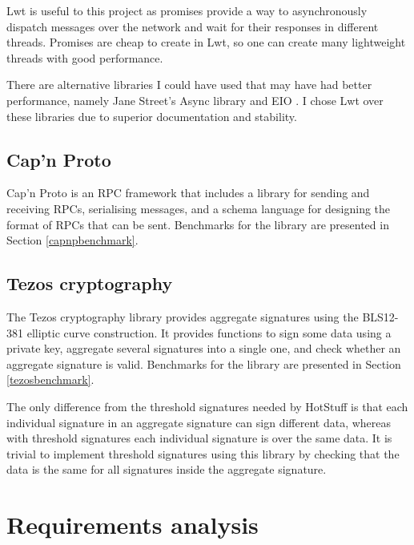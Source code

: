 Lwt is useful to this project as promises provide a way to asynchronously dispatch messages over the network and wait for their responses in different threads. Promises are cheap to create in Lwt, so one can create many lightweight threads with good performance.

There are alternative libraries I could have used that may have had better performance, namely Jane Street's Async library \cite{async} and EIO \cite{eio}. I chose Lwt over these libraries due to superior documentation and stability.

\subsection{Cap'n Proto}
Cap'n Proto  \cite{capnp} is an RPC framework that includes a library for sending and receiving RPCs, serialising messages, and a schema language for designing the format of RPCs that can be sent. Benchmarks for the library are presented in Section \ref{capnpbenchmark}.

\subsection{Tezos cryptography} \label{tezos}
The Tezos cryptography library \cite{tezosCrypto} provides aggregate signatures using the BLS12-381 elliptic curve construction. It provides functions to sign some data using a private key, aggregate several signatures into a single one, and check whether an aggregate signature is valid. Benchmarks for the library are presented in Section \ref{tezosbenchmark}.

The only difference from the threshold signatures needed by HotStuff is that each individual signature in an aggregate signature can sign different data, whereas with threshold signatures each individual signature is over the same data. It is trivial to implement threshold signatures using this library by checking that the data is the same for all signatures inside the aggregate signature.

\section{Requirements analysis} \label{requirements}

